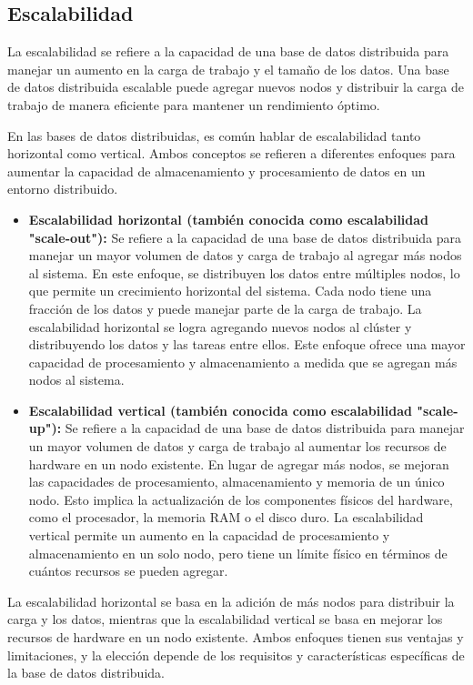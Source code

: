 \subsection{Escalabilidad}
\noindent
La escalabilidad se refiere a la capacidad de una base de datos distribuida para manejar un aumento en la carga de trabajo y el tamaño de los datos. Una base de datos distribuida escalable puede agregar nuevos nodos y distribuir la carga de trabajo de manera eficiente para mantener un rendimiento óptimo.

En las bases de datos distribuidas, es común hablar de escalabilidad tanto horizontal como vertical. Ambos conceptos se refieren a diferentes enfoques para aumentar la capacidad de almacenamiento y procesamiento de datos en un entorno distribuido.

\begin{itemize}
	\item \textbf{Escalabilidad horizontal (también conocida como escalabilidad "scale-out"):} Se refiere a la capacidad de una base de datos distribuida para manejar un mayor volumen de datos y carga de trabajo al agregar más nodos al sistema. En este enfoque, se distribuyen los datos entre múltiples nodos, lo que permite un crecimiento horizontal del sistema. Cada nodo tiene una fracción de los datos y puede manejar parte de la carga de trabajo. La escalabilidad horizontal se logra agregando nuevos nodos al clúster y distribuyendo los datos y las tareas entre ellos. Este enfoque ofrece una mayor capacidad de procesamiento y almacenamiento a medida que se agregan más nodos al sistema.
	\item \textbf{Escalabilidad vertical (también conocida como escalabilidad "scale-up"):} Se refiere a la capacidad de una base de datos distribuida para manejar un mayor volumen de datos y carga de trabajo al aumentar los recursos de hardware en un nodo existente. En lugar de agregar más nodos, se mejoran las capacidades de procesamiento, almacenamiento y memoria de un único nodo. Esto implica la actualización de los componentes físicos del hardware, como el procesador, la memoria RAM o el disco duro. La escalabilidad vertical permite un aumento en la capacidad de procesamiento y almacenamiento en un solo nodo, pero tiene un límite físico en términos de cuántos recursos se pueden agregar.
\end{itemize}

\begin{tcolorbox}[colback=yellow!10!white, colframe=blue!50!black, title=Resumiendo, coltitle=white]
	La escalabilidad horizontal se basa en la adición de más nodos para distribuir la carga y los datos, mientras que la escalabilidad vertical se basa en mejorar los recursos de hardware en un nodo existente. Ambos enfoques tienen sus ventajas y limitaciones, y la elección depende de los requisitos y características específicas de la base de datos distribuida.
\end{tcolorbox}


